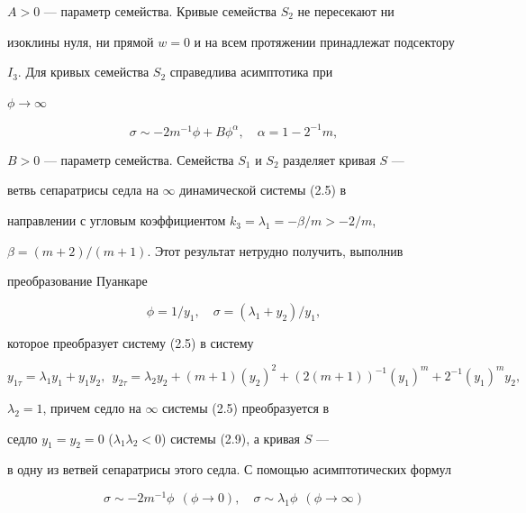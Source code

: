 $A>0$ --- параметр семейства. Кривые семейства $S_2$ не пересекают ни 


изоклины нуля, ни прямой $w=0$ и на всем протяжении принадлежат подсектору 


$I_3$. Для кривых семейства $S_2$ справедлива асимптотика при 


$\phi\to\infty$


\begin{equation} \sigma\sim 


-2m^{-1}\phi+B\phi^{\alpha},\quad \alpha=1-2^{-1}m,


\end{equation}


$B>0$ --- параметр семейства. Семейства $S_1$ и $S_2$ разделяет кривая $S$ --- 


ветвь сепаратрисы седла на $\infty$ динамической системы (2.5) в 


направлении с угловым коэффициентом $k_3=\lambda_1=-\beta/m>-2/m$, 


$\beta=(m+2)/(m+1)$. Этот результат нетрудно получить, выполнив 


преобразование Пуанкаре 


\begin{equation} 


\phi=1/y_1,\quad \sigma=(\lambda_1+y_2)/y_1, 


\end{equation} 


которое преобразует систему (2.5) в систему 


\begin{equation} 


y_{1\tau}=\lambda_1y_1+y_1y_2,\ \ y_{2\tau}=\lambda_2y_2+ 


(m+1)(y_2)^2+(2(m+1))^{-1}(y_1)^m+2^{-1} 


(y_1)^my_2, 


\end{equation} 


$\lambda_2=1$, причем седло на $\infty$ системы (2.5) преобразуется в 


седло $y_1=y_2=0$ ($\lambda_1\lambda_2<0$) системы (2.9), а кривая $S$ --- 


в одну из ветвей сепаратрисы этого седла. С помощью асимптотических формул 


$$ 


\sigma\sim -2m^{-1}\phi\ \ (\phi\to0),\quad 


\sigma\sim \lambda_1\phi\ \ (\phi\to\infty) 


$$ 


